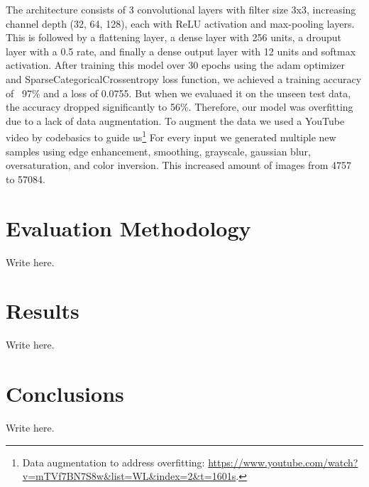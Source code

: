 \documentclass[10pt]{article}
\begin{document}
The architecture consists of 3 convolutional layers with filter size 3x3, increasing channel depth (32, 64, 128), each with ReLU activation and max-pooling layers. This is followed by a flattening layer, a dense layer with 256 units, a drouput layer with a 0.5 rate, and finally a dense output layer with 12 units and softmax activation. After training this model over 30 epochs using the adam optimizer and SparseCategoricalCrossentropy loss function, we achieved a training accuracy of ~97\% and a loss of 0.0755. But when we evaluaed it on the unseen test data, the accuracy dropped significantly to 56\%. Therefore, our model was overfitting due to a lack of data augmentation. To augment the data we used a YouTube video by codebasics to guide us\footnote{Data augmentation to address overfitting: \url{https://www.youtube.com/watch?v=mTVf7BN7S8w&list=WL&index=2&t=1601s}.} For every input we generated multiple new samples using edge enhancement, smoothing, grayscale, gaussian blur, oversaturation, and color inversion. This increased amount of images from 4757 to 57084. 






\section{Evaluation Methodology}

Write here. 




\section{Results}

Write here. 





\section{Conclusions}

Write here. 




\end{document}
